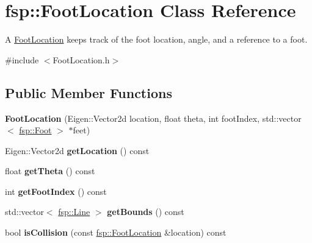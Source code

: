 \hypertarget{classfsp_1_1_foot_location}{\section{fsp\-:\-:Foot\-Location Class Reference}
\label{classfsp_1_1_foot_location}
}


A \hyperlink{classfsp_1_1_foot_location}{Foot\-Location} keeps track of the foot location, angle, and a reference to a foot.  




{\ttfamily \#include $<$Foot\-Location.\-h$>$}

\subsection*{Public Member Functions}
\begin{DoxyCompactItemize}
\item 
\hypertarget{classfsp_1_1_foot_location_aba724ddcb441d211817ed4c5c35d17e0}{{\bfseries Foot\-Location} (Eigen\-::\-Vector2d location, float theta, int foot\-Index, std\-::vector$<$ \hyperlink{classfsp_1_1_foot}{fsp\-::\-Foot} $>$ $\ast$feet)}\label{classfsp_1_1_foot_location_aba724ddcb441d211817ed4c5c35d17e0}

\item 
\hypertarget{classfsp_1_1_foot_location_aed12136109453c79d63406d1ebad3cdf}{Eigen\-::\-Vector2d {\bfseries get\-Location} () const }\label{classfsp_1_1_foot_location_aed12136109453c79d63406d1ebad3cdf}

\item 
\hypertarget{classfsp_1_1_foot_location_a7c4c992e80e58b2d03379d7682d7ddb2}{float {\bfseries get\-Theta} () const }\label{classfsp_1_1_foot_location_a7c4c992e80e58b2d03379d7682d7ddb2}

\item 
\hypertarget{classfsp_1_1_foot_location_aff290114dcfd14b2f563426043b5a948}{int {\bfseries get\-Foot\-Index} () const }\label{classfsp_1_1_foot_location_aff290114dcfd14b2f563426043b5a948}

\item 
\hypertarget{classfsp_1_1_foot_location_a9b76744ed01adb7b605eccbc208025d9}{std\-::vector$<$ \hyperlink{classfsp_1_1_line}{fsp\-::\-Line} $>$ {\bfseries get\-Bounds} () const }\label{classfsp_1_1_foot_location_a9b76744ed01adb7b605eccbc208025d9}

\item 
\hypertarget{classfsp_1_1_foot_location_aceaa6d701958bb5deeb88ce1891e5b16}{bool {\bfseries is\-Collision} (const \hyperlink{classfsp_1_1_foot_location}{fsp\-::\-Foot\-Location} \&location) const }\label{classfsp_1_1_foot_location_aceaa6d701958bb5deeb88ce1891e5b16}

\end{DoxyCompactItemize}


